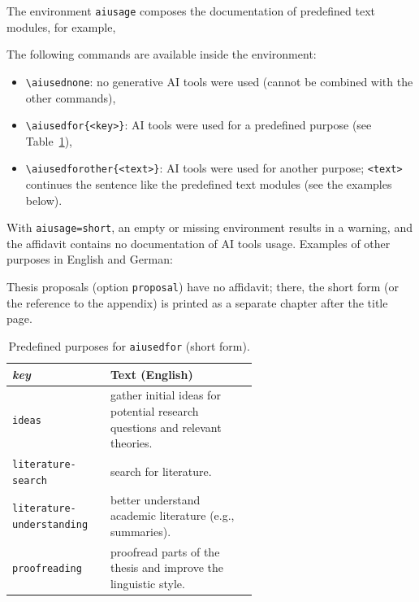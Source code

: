 \documentclass[language=english]{hgbarticle}
\begin{document}
The environment \texttt{aiusage} composes the documentation of predefined text modules, for example,
%
\begin{LaTeXCode}[numbers=none]
\begin{aiusage}
\end{aiusage}
\end{LaTeXCode}
%
The following commands are available inside the environment:
\begin{itemize}
	\item \verb!\aiusednone!: no generative AI tools were used (cannot be combined with the other commands),
	\item \verb!\aiusedfor{<key>}!: AI tools were used for a predefined purpose (see Table~\ref{tab:AIUsagePurposes}),
	\item \verb!\aiusedforother{<text>}!: AI tools were used for another purpose; \verb!<text>! continues
		the sentence like the predefined text modules (see the examples below).
\end{itemize}
With \texttt{aiusage=short}, an empty or missing environment results in a warning, and the
affidavit contains no documentation of AI tools usage. Examples of other purposes in English and German:
%
\begin{LaTeXCode}[numbers=none]
\end{LaTeXCode}
%
Thesis proposals (option \texttt{proposal}) have no affidavit; there, the short form (or the reference
to the appendix) is printed as a separate chapter after the title page.

\begin{table}[H]
\caption{Predefined purposes for \texttt{\bs aiusedfor} (short form).}
\label{tab:AIUsagePurposes}
\centering\small
\begin{tabular}{@{}lp{0.6\linewidth}@{}}
	\toprule
	\textit{key} & Text (English) \\
	\midrule
	\texttt{ideas}                    & gather initial ideas for potential research questions and relevant theories. \\
	\texttt{literature-search}        & search for literature. \\
	\texttt{literature-understanding} & better understand academic literature (e.g., summaries). \\
	\texttt{proofreading}             & proofread parts of the thesis and improve the linguistic style. \\
	\bottomrule
\end{tabular}
\end{table}
\end{document}
